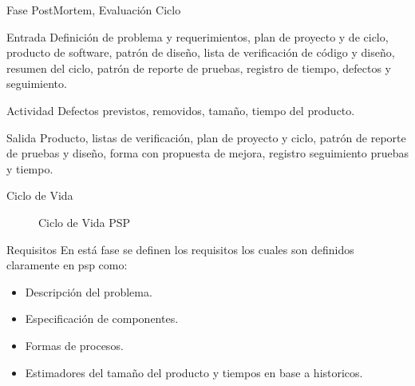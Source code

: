 \documentclass{beamer}
\begin{document}
			\begin{frame}{Fase PostMortem, Evaluación Ciclo}
				\begin{block}{Entrada}
					Definición de problema y requerimientos, plan de proyecto y de ciclo, producto de software, patrón de diseño, lista de verificación de código y diseño, resumen del ciclo, patrón de reporte de pruebas, registro de tiempo, defectos y seguimiento.
				\end{block}
				\begin{block}{Actividad}
					Defectos previstos, removidos, tamaño, tiempo del producto.
				\end{block}
				\begin{block}{Salida}
					Producto, listas de verificación, plan de proyecto y ciclo, patrón de reporte de pruebas y diseño, forma con propuesta de mejora, registro seguimiento pruebas y tiempo.
				\end{block}
			\end{frame}				
					
			\begin{frame}{Ciclo de Vida}
				\begin{figure}								
					 \caption{Ciclo de Vida PSP}
				\end{figure}			
			\end{frame}
			
			\begin{frame}{Requisitos}
				En está fase se definen los requisitos los cuales son definidos claramente en psp como:
					\begin{itemize}
						\item Descripción del problema.
						\item Especificación de componentes.
						\item Formas de procesos.
						\item Estimadores del tamaño del producto y tiempos en base a historicos.
					\end{itemize}
			\end{frame}					
			
\end{document}
